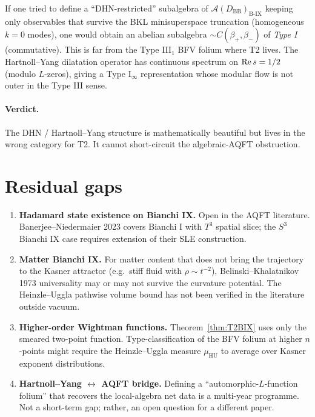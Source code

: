 \documentclass[11pt,a4paper]{article}
\theoremstyle{definition}
\newcommand{\AAA}{\mathcal{A}}
\newcommand{\BIX}{\mathrm{B\text{-}IX}}
\newcommand{\BB}{\mathrm{BB}}
\newcommand{\rmHU}{\mathrm{HU}}
\begin{document}
If one tried to define a ``DHN-restricted'' subalgebra of
$\AAA(D_\BB)_\BIX$ keeping only observables that survive the BKL
minisuperspace truncation (homogeneous $k=0$ modes), one would obtain an
abelian subalgebra $\sim C(\beta_+,\beta_-)$ of \emph{Type I}
(commutative). This is far from the Type III${}_1$ BFV folium where T2
lives. The Hartnoll--Yang dilatation operator has continuous spectrum
on ${\rm Re}\,s=1/2$ (modulo $L$-zeros), giving a Type I${}_\infty$
representation whose modular flow is not outer in the Type III sense.

\paragraph{Verdict.} The DHN / Hartnoll--Yang structure is mathematically
beautiful but lives in the wrong category for T2. It cannot short-circuit
the algebraic-AQFT obstruction.

\section{Residual gaps}

\begin{enumerate}[label=(G\arabic*)]
\item \textbf{Hadamard state existence on Bianchi IX.} Open in the AQFT
literature. Banerjee--Niedermaier 2023 \cite{BanerjeeNiedermaier2023}
covers Bianchi I with $T^3$ spatial slice; the $S^3$ Bianchi IX case
requires extension of their SLE construction.

\item \textbf{Matter Bianchi IX.} For matter content that does not bring
the trajectory to the Kasner attractor (e.g.\ stiff fluid with
$\rho\sim t^{-2}$), Belinski--Khalatnikov 1973 universality may or may
not survive the curvature potential. The Heinzle--Uggla pathwise volume
bound has not been verified in the literature outside vacuum.

\item \textbf{Higher-order Wightman functions.} Theorem~\ref{thm:T2BIX}
uses only the smeared two-point function. Type-classification of the BFV
folium at higher $n$-points might require the Heinzle--Uggla measure
$\mu_\rmHU$ to average over Kasner exponent distributions.

\item \textbf{Hartnoll--Yang $\leftrightarrow$ AQFT bridge.} Defining a
``automorphic-$L$-function folium'' that recovers the local-algebra net
data is a multi-year programme. Not a short-term gap; rather, an open
question for a different paper.
\end{enumerate}
\end{document}

